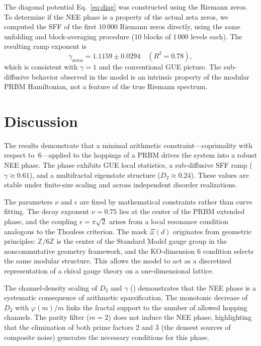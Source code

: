 \documentclass[11pt,a4paper]{article}
\begin{document}
The diagonal potential Eq.~\eqref{eq:diag} was constructed using the Riemann zeros. To determine if the NEE phase is a property of the actual zeta zeros, we computed the SFF of the first $10\,000$ Riemann zeros directly, using the same unfolding and block-averaging procedure (10 blocks of 1\,000 levels each). The resulting ramp exponent is
\begin{equation}
\gamma_{\text{zeros}} = 1.1159 \pm 0.0294 \quad (R^2=0.78),
\end{equation}
which is consistent with $\gamma=1$ and the conventional GUE picture. The sub-diffusive behavior observed in the model is an intrinsic property of the modular PRBM Hamiltonian, not a feature of the true Riemann spectrum.

\section{Discussion}
\label{sec:discussion}

The results demonstrate that a minimal arithmetic constraint---coprimality with respect to~6---applied to the hoppings of a PRBM drives the system into a robust NEE phase. The phase exhibits GUE local statistics, a sub-diffusive SFF ramp ($\gamma\approx0.61$), and a multifractal eigenstate structure ($D_2\approx0.24$). These values are stable under finite-size scaling and across independent disorder realizations.

The parameters $\nu$ and $\epsilon$ are fixed by mathematical constraints rather than curve fitting. The decay exponent $\nu=0.75$ lies at the center of the PRBM extended phase, and the coupling $\epsilon=\pi\sqrt{2}$ arises from a local resonance condition analogous to the Thouless criterion. The mask $\Xi(d)$ originates from geometric principles: $\mathbb{Z}/6\mathbb{Z}$ is the center of the Standard Model gauge group in the noncommutative geometry framework, and the KO-dimension 6 condition selects the same modular structure. This allows the model to act as a discretized representation of a chiral gauge theory on a one-dimensional lattice.

The channel-density scaling of $D_2$ and $\gamma$ () demonstrates that the NEE phase is a systematic consequence of arithmetic sparsification. The monotonic decrease of $D_2$ with $\varphi(m)/m$ links the fractal support to the number of allowed hopping channels. The parity filter ($m=2$) does not induce the NEE phase, highlighting that the elimination of both prime factors 2 and 3 (the densest sources of composite noise) generates the necessary conditions for this phase.
\end{document}
